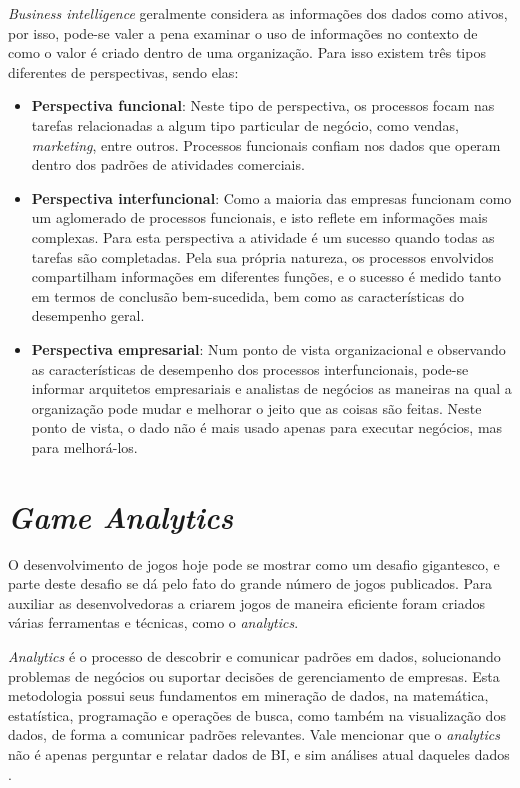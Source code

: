 \textit{Business intelligence} geralmente considera as informações dos dados como ativos, por isso, pode-se valer a pena examinar o uso de informações no contexto de como o valor é criado dentro de uma organização. Para isso existem três tipos diferentes de perspectivas, sendo elas:
\begin{itemize}
		\item \textbf{Perspectiva funcional}: Neste tipo de perspectiva, os processos focam nas tarefas relacionadas a algum tipo particular de negócio, como vendas, \textit{marketing}, entre outros. Processos funcionais confiam nos dados que operam dentro dos padrões de atividades comerciais.
		\item \textbf{Perspectiva interfuncional}: Como a maioria das empresas funcionam como um aglomerado de processos funcionais, e isto reflete em informações mais complexas. Para esta perspectiva a atividade é um sucesso quando todas as tarefas são completadas. Pela sua própria natureza, os processos envolvidos compartilham informações em diferentes funções, e o sucesso é medido tanto em termos de conclusão bem-sucedida, bem como as características do desempenho geral.
		\item \textbf{Perspectiva empresarial}: Num ponto de vista organizacional e observando as características de desempenho dos processos interfuncionais, pode-se informar arquitetos empresariais e analistas de negócios as maneiras na qual a organização pode mudar e melhorar o jeito que as coisas são feitas. Neste ponto de vista, o dado não é mais usado apenas para executar negócios, mas para melhorá-los.
\end{itemize}

\section{\textit{Game Analytics}}
O desenvolvimento de jogos hoje pode se mostrar como um desafio gigantesco, e parte deste desafio se dá pelo fato do grande número de jogos publicados. Para auxiliar as desenvolvedoras a criarem jogos de maneira eficiente foram criados várias ferramentas e técnicas, como o \textit{analytics}.

\textit{Analytics} é o processo de descobrir e comunicar padrões em dados, solucionando problemas de negócios ou suportar decisões de gerenciamento de empresas. Esta metodologia possui seus fundamentos em mineração de dados, na matemática, estatística, programação e operações de busca, como também na visualização dos dados, de forma a comunicar padrões relevantes. Vale mencionar que o \textit{analytics} não é apenas perguntar e relatar dados de BI, e sim análises atual daqueles dados \cite{analytics}. 


